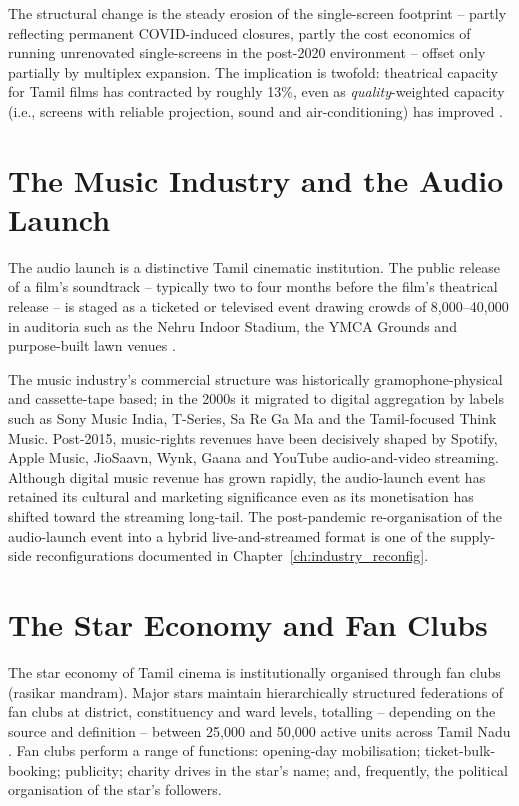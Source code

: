 The structural change is the steady erosion of the single-screen
footprint -- partly reflecting permanent COVID-induced closures,
partly the cost economics of running unrenovated single-screens in
the post-2020 environment -- offset only partially by multiplex
expansion.  The implication is twofold: theatrical capacity for
Tamil films has contracted by roughly 13\%, even as
\emph{quality}-weighted capacity (i.e., screens with reliable
projection, sound and air-conditioning) has improved
\citep{ormax2024}.

\section{The Music Industry and the Audio Launch}
\label{sec:music}

The audio launch is a distinctive Tamil cinematic institution.  The
public release of a film's soundtrack -- typically two to four
months before the film's theatrical release -- is staged as a
ticketed or televised event drawing crowds of 8{,}000--40{,}000 in
auditoria such as the Nehru Indoor Stadium, the YMCA Grounds and
purpose-built lawn venues
\citep{velayutham2008,filmcompanion2019audio}.

The music industry's commercial structure was historically
gramophone-physical and cassette-tape based; in the 2000s it
migrated to digital aggregation by labels such as Sony Music India,
T-Series, Sa Re Ga Ma and the Tamil-focused Think Music.
Post-2015, music-rights revenues have been decisively shaped by
Spotify, Apple Music, JioSaavn, Wynk, Gaana and YouTube
audio-and-video streaming.  Although digital music revenue has
grown rapidly, the audio-launch event has retained its cultural and
marketing significance even as its monetisation has shifted toward
the streaming long-tail.  The post-pandemic re-organisation of the
audio-launch event into a hybrid live-and-streamed format is one of
the supply-side reconfigurations documented in
Chapter~\ref{ch:industry_reconfig}.

\section{The Star Economy and Fan Clubs}
\label{sec:starecon}

The star economy of Tamil cinema is institutionally organised
through fan clubs (rasikar mandram).  Major stars maintain
hierarchically structured federations of fan clubs at district,
constituency and ward levels, totalling -- depending on the source
and definition -- between 25{,}000 and 50{,}000 active units across
Tamil Nadu \citep{nakassis2017,pandian1992}.  Fan clubs perform a
range of functions: opening-day mobilisation; ticket-bulk-booking;
publicity; charity drives in the star's name; and, frequently, the
political organisation of the star's followers.

